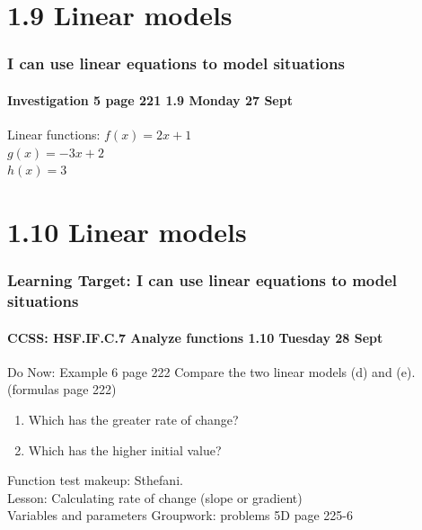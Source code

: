 \documentclass{beamer}
\begin{document}
  \section{1.9 Linear models}
  \frame
  {
    \frametitle{I can use linear equations to model situations}
    \framesubtitle{Investigation 5 page 221 \hfill \alert{1.9 Monday 27 Sept}}

    \begin{block}{Linear functions:}\vspace{0.5cm}
       $f(x)=2x+1$\\[1cm]
       $g(x)=-3x+2$\\[1cm]
       $h(x)=3$
    \end{block}\vspace{1.5cm}
  }

  \section{1.10 Linear models}
  \frame
  {
    \frametitle{Learning Target: I can use linear equations to model situations}
    \framesubtitle{CCSS: HSF.IF.C.7 Analyze functions \hfill \alert{1.10 Tuesday 28 Sept}}

    \begin{block}{Do Now: Example 6 page 222}
        Compare the two linear models (d) and (e). (formulas page 222)
        \begin{enumerate}
          \item Which has the greater rate of change?
          \item Which has the higher initial value?
        \end{enumerate}
    \end{block}\vspace{0.5cm}
    Function test makeup: Sthefani.\\[0.5cm]
    Lesson: Calculating rate of change (slope or gradient)\\[0.25cm]
    Variables and parameters
    Groupwork: problems 5D page 225-6
  }
\end{document}

